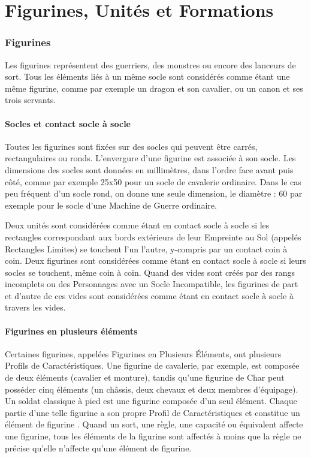 
\part{Figurines, Unités et Formations}

\section{Figurines}

Les figurines représentent des guerriers, des monstres ou encore des lanceurs de sort. Tous les éléments liés à un même socle sont considérés comme étant une même figurine, comme par exemple un dragon et son cavalier, ou un canon et ses trois servants.

\subsection{Socles et contact socle à socle}

Toutes les figurines sont fixées sur des socles qui peuvent être carrés, rectangulaires ou ronds. L'envergure d'une figurine est associée à son socle. Les dimensions des socles sont données en millimètres, dans l'ordre face avant puis côté, comme par exemple \unit{25x50}{\milli\meter} pour un socle de cavalerie ordinaire. Dans le cas peu fréquent d'un socle rond, on donne une seule dimension, le diamètre : \unit{60}{\milli\meter} par exemple pour le socle d'une Machine de Guerre ordinaire.

Deux unités sont considérées comme étant en contact socle à socle si les rectangles correspondant aux bords extérieurs de leur Empreinte au Sol (appelés Rectangles Limites) se touchent l'un l'autre, y-compris par un contact coin à coin. Deux figurines sont considérées comme étant en contact socle à socle si leurs socles se touchent, même coin à coin. Quand des vides sont créés par des rangs incomplets ou des Personnages avec un Socle Incompatible, les figurines de part et d'autre de ces vides sont considérées comme étant en contact socle à socle à travers les vides.

\subsection{Figurines en plusieurs éléments}

Certaines figurines, appelées Figurines en Plusieurs Éléments, ont plusieurs Profils de Caractéristiques. Une figurine de cavalerie, par exemple, est composée de deux éléments (cavalier et monture), tandis qu'une figurine de Char peut posséder cinq éléments (un châssis, deux chevaux et deux membres d'équipage). Un soldat classique à pied est une figurine composée d'un seul élément. Chaque partie d'une telle figurine a son propre Profil de Caractéristiques et constitue un \og élément de figurine \fg{}. Quand un sort, une règle, une capacité ou équivalent affecte une figurine, tous les éléments de la figurine sont affectés à moins que la règle ne précise qu'elle n'affecte qu'une élément de figurine.

